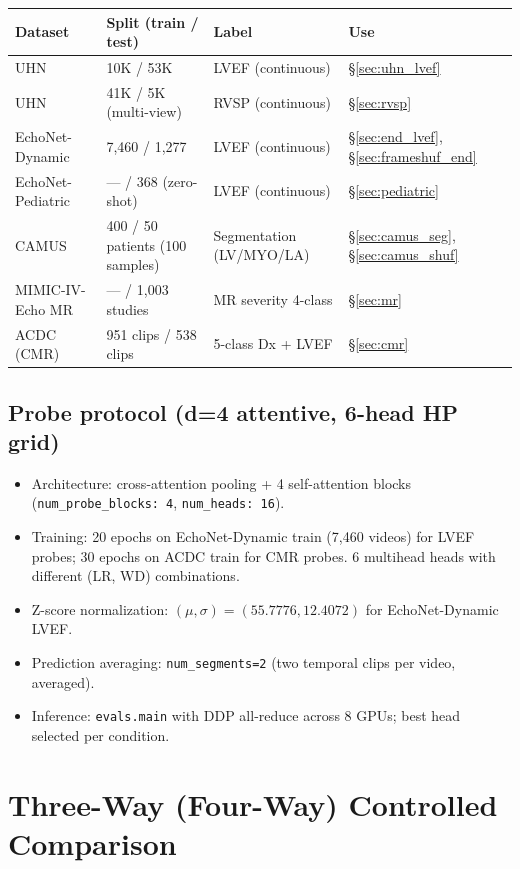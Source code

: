 \documentclass{article}
\begin{document}
\begin{center}
\begin{tabular}{llll}
\toprule
Dataset & Split (train / test) & Label & Use \\
\midrule
UHN        & 10K / 53K  & LVEF (continuous) & §\ref{sec:uhn_lvef} \\
UHN        & 41K / 5K (multi-view) & RVSP (continuous) & §\ref{sec:rvsp} \\
EchoNet-Dynamic & 7{,}460 / 1{,}277 & LVEF (continuous) & §\ref{sec:end_lvef}, §\ref{sec:frameshuf_end} \\
EchoNet-Pediatric & --- / 368 (zero-shot) & LVEF (continuous) & §\ref{sec:pediatric} \\
CAMUS      & 400 / 50 patients (100 samples) & Segmentation (LV/MYO/LA) & §\ref{sec:camus_seg}, §\ref{sec:camus_shuf} \\
MIMIC-IV-Echo MR & --- / 1{,}003 studies & MR severity 4-class & §\ref{sec:mr} \\
ACDC (CMR) & 951 clips / 538 clips & 5-class Dx + LVEF & §\ref{sec:cmr} \\
\bottomrule
\end{tabular}
\end{center}

\subsection{Probe protocol (d=4 attentive, 6-head HP grid)}

\begin{itemize}
\item Architecture: cross-attention pooling + 4 self-attention blocks (\texttt{num\_probe\_blocks: 4}, \texttt{num\_heads: 16}).
\item Training: 20 epochs on EchoNet-Dynamic train (7{,}460 videos) for LVEF probes; 30 epochs on ACDC train for CMR probes. 6 multihead heads with different (LR, WD) combinations.
\item Z-score normalization: $(\mu, \sigma) = (55.7776, 12.4072)$ for EchoNet-Dynamic LVEF.
\item Prediction averaging: \texttt{num\_segments=2} (two temporal clips per video, averaged).
\item Inference: \texttt{evals.main} with DDP all-reduce across 8 GPUs; best head selected per condition.
\end{itemize}

\section{Three-Way (Four-Way) Controlled Comparison}
\end{document}

